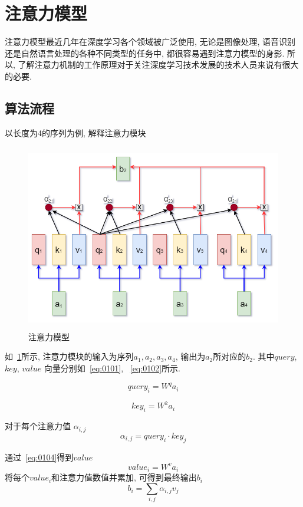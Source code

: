 \section{注意力模型}
注意力模型最近几年在深度学习各个领域被广泛使用, 无论是图像处理, 语音识别还是自然语言处理的各种不同类型的任务中, 都很容易遇到注意力模型的身影. 所以, 了解注意力机制的工作原理对于关注深度学习技术发展的技术人员来说有很大的必要. 

\subsection{算法流程}
以长度为4的序列为例, 解释注意力模块
\begin{figure}[!htbp]
    \centering
    \includegraphics[height=22em]{pic/pic0101.png}
    \caption{注意力模型}
    \label{fig:0101}
\end{figure}

如~\ref{fig:0101}所示, 注意力模块的输入为序列$a_{1}, a_{2}, a_{3}, a_{4}$, 输出为$a_{2}$所对应的$b_{2}$. 其中$query$, $key$, $value$ 向量分别如~\ref{eq:0101}, ~\ref{eq:0102}所示.

\begin{equation}
    query_{i} = W^{q} a_{i}
    \label{eq:0101}
\end{equation}

\begin{equation}
    key_{i} = W^{k} a_{i}
    \label{eq:0102}
\end{equation}

对于每个注意力值 $\alpha_{i,j}$ 
\begin{equation}
    \alpha_{i,j} = query_{i} \cdot key_{j}
    \label{eq:0103}
\end{equation}

通过~\ref{eq:0104}得到$value$
\begin{equation}
    value_{i} = W^{v} a_{i}
    \label{eq:0104}
\end{equation}
将每个$value_{i}$和注意力值数值并累加, 可得到最终输出$b_{i}$
\begin{equation}
    b_{i} = \sum_{i, j} \alpha_{i,j} v_{j}
    \label{eq:0105}
\end{equation}

